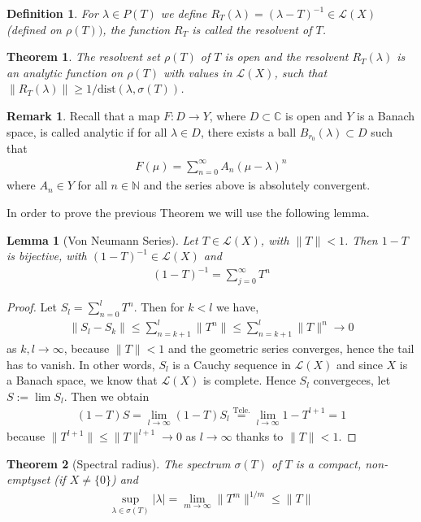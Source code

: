 \documentclass[11pt,a4paper]{article}
\newtheorem{lem}{Lemma}[section]
\newtheorem{thm}{Theorem}[section]
\newtheorem{defn}{Definition}[section]
\theoremstyle{definition}
\newtheorem{rem}{Remark}[section]
\begin{document}
\begin{defn} For $ \lambda \in P(T)$ we define $R_T( \lambda) = ( \lambda-T)^{-1} \in \mathcal{L}(X)$ (defined on $\rho(T))$, the function $R_T$ is called the resolvent of $T$. 
\end{defn}
\begin{thm} The resolvent set $\rho(T)$ of $T$ is open and the resolvent $R_T( \lambda)$ is an analytic function on $\rho(T)$ with values in $\mathcal{L}(X)$, such that $\|R_T( \lambda)\| \geq 1/ \text{dist}( \lambda, \sigma(T))$. 
\end{thm}
\begin{rem} Recall that a map $F: D \to Y$, where $D \subset \mathbb{C}$ is open and $Y$ is a Banach space, is called analytic if for all $\lambda \in D$, there exists a ball $B_{r_0}( \lambda) \subset D$ such that 
\begin{align*}
F ( \mu) = \sum_{n=0}^\infty A_n( \mu- \lambda)^n
\end{align*}
where $A_n \in Y$ for all $n \in \mathbb{N}$ and the series above is absolutely convergent. 
\end{rem}
\newpage
In order to prove the previous Theorem we will use the following lemma. 
\begin{lem}[Von Neumann Series] Let $T \in \mathcal{L}(X)$, with $\| T \| < 1$. Then $1-T$ is bijective, with $(1-T)^{-1} \in \mathcal{L}(X)$ and 
\begin{align*}
(1-T)^{-1} = \sum_{j=0}^\infty T^n
\end{align*}
\end{lem}
\begin{proof}
Let $S_l = \sum_{n=0}^l T^n.$ Then for $k < l$ we have,
\begin{align*}
\|S_l-S_k\| \leq \sum_{n=k+1}^l \|T^n\| \leq \sum_{n=k+1}^l \|T\|^n \to 0
\end{align*}
as $k,l \to \infty$, because $\|T\|<1$ and the geometric series converges, hence the tail has to vanish. In other words, $S_l$ is a Cauchy sequence in $\mathcal{L}(X)$ and since $X$ is a Banach space, we know that $\mathcal{L}(X)$ is complete. Hence $S_l$ convergeces, let $S:= \lim S_l$. Then we obtain
\begin{align*}
(1-T)S= \lim_{l \to \infty} (1-T)S_l \overset{\text{Tele.}}= \lim_{l \to \infty} 1-T^{l+1}=1
\end{align*}
because $\|T^{l+1}\| \leq \|T\|^{l+1} \to 0$ as $l \to \infty$ thanks to $\|T\| < 1$. 
\end{proof}
\begin{thm}[Spectral radius] The spectrum $\sigma(T)$ of $T$ is a compact, non-emptyset (if $X \neq \lbrace 0 \rbrace$) and 
\begin{align*}
\sup_{ \lambda \in \sigma(T)} | \lambda| = \lim_{m \to \infty} \| T^m \|^{1/m} \leq \|T\|
\end{align*}
\end{thm}
\end{document}
